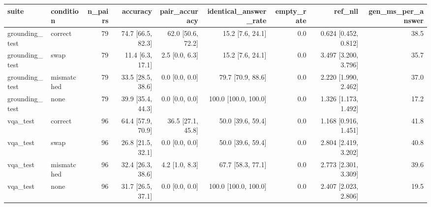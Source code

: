 \begin{tabular}{llrrrrrrr}
\toprule
suite & condition & n\_pairs & accuracy & pair\_accuracy & identical\_answer\_rate & empty\_rate & ref\_nll & gen\_ms\_per\_answer \\
\midrule
grounding\_test & correct & 79 & 74.7 [66.5, 82.3] & 62.0 [50.6, 72.2] & 15.2 [7.6, 24.1] & 0.0 & 0.624 [0.452, 0.812] & 38.5 \\
grounding\_test & swap & 79 & 11.4 [6.3, 17.1] & 2.5 [0.0, 6.3] & 15.2 [7.6, 24.1] & 0.0 & 3.497 [3.200, 3.796] & 35.7 \\
grounding\_test & mismatched & 79 & 33.5 [28.5, 38.6] & 0.0 [0.0, 0.0] & 79.7 [70.9, 88.6] & 0.0 & 2.220 [1.990, 2.462] & 37.0 \\
grounding\_test & none & 79 & 39.9 [35.4, 44.3] & 0.0 [0.0, 0.0] & 100.0 [100.0, 100.0] & 0.0 & 1.326 [1.173, 1.492] & 17.2 \\
vqa\_test & correct & 96 & 64.4 [57.9, 70.9] & 36.5 [27.1, 45.8] & 50.0 [39.6, 59.4] & 0.0 & 1.168 [0.916, 1.451] & 41.8 \\
vqa\_test & swap & 96 & 26.8 [21.5, 32.1] & 0.0 [0.0, 0.0] & 50.0 [39.6, 59.4] & 0.0 & 2.804 [2.419, 3.202] & 40.8 \\
vqa\_test & mismatched & 96 & 32.4 [26.3, 38.6] & 4.2 [1.0, 8.3] & 67.7 [58.3, 77.1] & 0.0 & 2.773 [2.301, 3.309] & 39.6 \\
vqa\_test & none & 96 & 31.7 [26.5, 37.1] & 0.0 [0.0, 0.0] & 100.0 [100.0, 100.0] & 0.0 & 2.407 [2.023, 2.806] & 19.5 \\
\bottomrule
\end{tabular}
